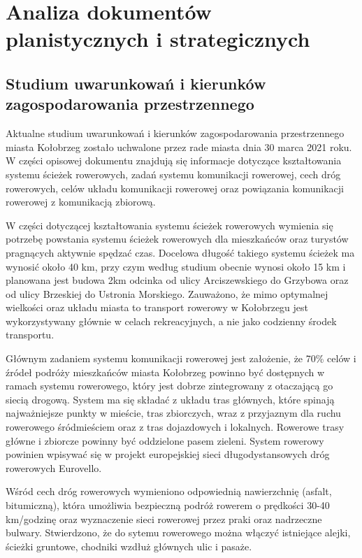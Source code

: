 \documentclass{amuthesis}
\begin{document}
\hypertarget{polityka}{%
\chapter{Analiza dokumentów planistycznych i strategicznych}\label{polityka}}

\hypertarget{studium}{%
\section{Studium uwarunkowań i kierunków zagospodarowania przestrzennego}\label{studium}}

Aktualne studium uwarunkowań i kierunków zagospodarowania przestrzennego miasta Kołobrzeg zostało uchwalone przez rade miasta dnia 30 marca 2021 roku.
W części opisowej dokumentu znajdują się informacje dotyczące kształtowania systemu ścieżek rowerowych, zadań systemu komunikacji rowerowej, cech dróg rowerowych, celów układu komunikacji rowerowej oraz powiązania komunikacji rowerowej z komunikacją zbiorową.

W części dotyczącej kształtowania systemu ścieżek rowerowych wymienia się potrzebę powstania systemu ścieżek rowerowych dla mieszkańców oraz turystów pragnących aktywnie spędzać czas. Docelowa długość takiego systemu ścieżek ma wynosić około 40 km, przy czym według studium obecnie wynosi około 15 km i planowana jest budowa 2km odcinka od ulicy Arciszewskiego do Grzybowa oraz od ulicy Brzeskiej do Ustronia Morskiego.
Zauważono, że mimo optymalnej wielkości oraz układu miasta to transport rowerowy w Kołobrzegu jest wykorzystywany głównie w celach rekreacyjnych, a nie jako codzienny środek transportu.

Głównym zadaniem systemu komunikacji rowerowej jest założenie, że 70\% celów i źródeł podróży mieszkańców miasta Kołobrzeg powinno być dostępnych w ramach systemu rowerowego, który jest dobrze zintegrowany z otaczającą go siecią drogową.
System ma się składać z układu tras głównych, które spinają najważniejsze punkty w mieście, tras zbiorczych, wraz z przyjaznym dla ruchu rowerowego śródmieściem oraz z tras dojazdowych i lokalnych.
Rowerowe trasy główne i zbiorcze powinny być oddzielone pasem zieleni.
System rowerowy powinien wpisywać się w projekt europejskiej sieci długodystansowych dróg rowerowych Eurovello.

Wśród cech dróg rowerowych wymieniono odpowiednią nawierzchnię (asfalt, bitumiczną), która umożliwia bezpieczną podróż rowerem o prędkości 30-40 km/godzinę oraz wyznaczenie sieci rowerowej przez praki oraz nadrzeczne bulwary.
Stwierdzono, że do sytemu rowerowego można włączyć istniejące alejki, ścieżki gruntowe, chodniki wzdłuż głównych ulic i pasaże.
\end{document}
